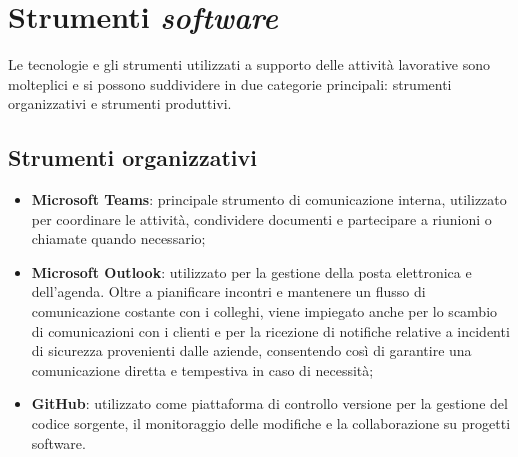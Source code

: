 \section{Strumenti \textit{software}}

Le tecnologie e gli strumenti utilizzati a supporto delle attività lavorative sono molteplici e si possono suddividere in due categorie principali: strumenti organizzativi e strumenti produttivi.

\subsection{Strumenti organizzativi}
\begin{itemize}
    \item \textbf{Microsoft Teams}: principale strumento di comunicazione interna, utilizzato per coordinare le attività, condividere documenti e partecipare a riunioni o chiamate quando necessario;
    \item \textbf{Microsoft Outlook}: utilizzato per la gestione della posta elettronica e dell'agenda. Oltre a pianificare incontri e mantenere un flusso di comunicazione costante con i colleghi, viene impiegato anche per lo scambio di comunicazioni con i clienti e per la ricezione di notifiche relative a incidenti di sicurezza provenienti dalle aziende, consentendo così di garantire una comunicazione diretta e tempestiva in caso di necessità;
    \item \textbf{GitHub}: utilizzato come piattaforma di controllo versione per la gestione del codice sorgente, il monitoraggio delle modifiche e la collaborazione su progetti software.
\end{itemize}


